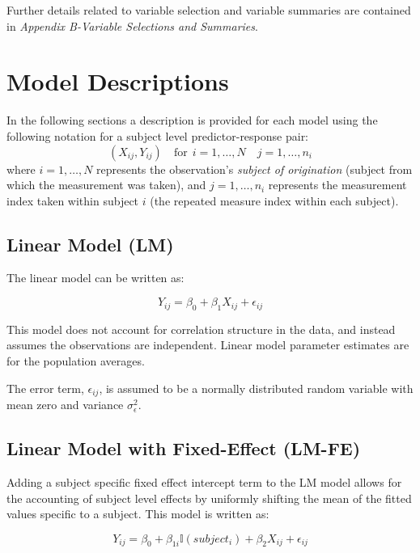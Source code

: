 \documentclass[12pt,]{article}
\begin{document}
Further details related to variable selection and variable summaries are
contained in \textit{Appendix B-Variable Selections and Summaries}.

\hypertarget{model-descriptions}{%
\section{Model Descriptions}\label{model-descriptions}}

In the following sections a description is provided for each model using
the following notation for a subject level predictor-response pair:
\[\left(X_{ij},Y_{ij} \right)  \quad \text{for} \ \ i=1,\ldots,N \quad j=1,\ldots,n_{i} \]
where \(i=1,\ldots,N\) represents the observation's
\textit{subject of origination} (subject from which the measurement was
taken), and \(j=1,\ldots,n_{i}\) represents the measurement index taken
within subject \(i\) (the repeated measure index within each subject).

\newpage

\hypertarget{linear-model-lm}{%
\subsection{Linear Model (LM)}\label{linear-model-lm}}

The linear model can be written as:

\[Y_{ij}=\beta_{0} + \beta_{1} X_{ij} + \epsilon_{ij}\]

This model does not account for correlation structure in the data, and
instead assumes the observations are independent. Linear model parameter
estimates are for the population averages.

The error term, \(\epsilon_{ij}\), is assumed to be a normally
distributed random variable with mean zero and variance
\(\sigma_{\epsilon}^{2}\).

\hypertarget{linear-model-with-fixed-effect-lm-fe}{%
\subsection{Linear Model with Fixed-Effect
(LM-FE)}\label{linear-model-with-fixed-effect-lm-fe}}

Adding a subject specific fixed effect intercept term to the LM model
allows for the accounting of subject level effects by uniformly shifting
the mean of the fitted values specific to a subject. This model is
written as:

\[Y_{ij} = \beta_{0} + \beta_{1i}\mathbb{I}(subject_{i})+\beta_{2} X_{ij} + \epsilon_{ij}\]
\end{document}
